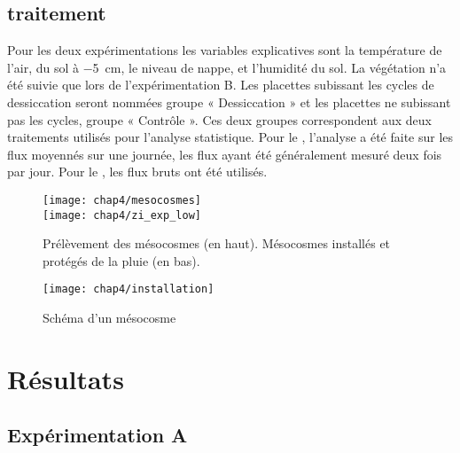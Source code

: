 \subsection{traitement}

Pour les deux expérimentations les variables explicatives sont la température de l'air, du sol à \SI{-5}{\centi\metre}, le niveau de nappe, et l'humidité du sol. La végétation n'a été suivie que lors de l'expérimentation B.
Les placettes subissant les cycles de dessiccation seront nommées groupe « Dessiccation » et les placettes ne subissant pas les cycles, groupe « Contrôle ».
Ces deux groupes correspondent aux deux traitements utilisés pour l'analyse statistique.
Pour le \coo, l'analyse a été faite sur les flux moyennés sur une journée, les flux ayant été généralement mesuré deux fois par jour.
Pour le \chh, les flux bruts ont été utilisés.

\begin{figure}
\centering
\texttt{[image: chap4/mesocosmes]}\\
\texttt{[image: chap4/zi\_exp\_low]}
\caption{Prélèvement des mésocosmes (en haut). Mésocosmes installés et protégés de la pluie (en bas).}
\label{fig:mesophoto}
\end{figure}




\begin{figure}
\centering
\texttt{[image: chap4/installation]}
\caption{Schéma d'un mésocosme}
\label{fig:mesocarte}
\end{figure}

\section{Résultats}

\subsection{Expérimentation A}

